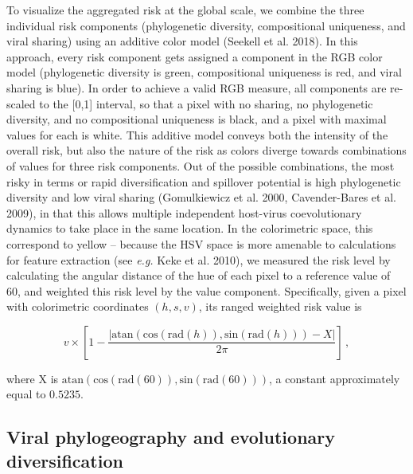 \documentclass[11pt]{article}
\begin{document}
To visualize the aggregated risk at the global scale, we combine the
three individual risk components (phylogenetic diversity, compositional
uniqueness, and viral sharing) using an additive color model (Seekell et
al. 2018). In this approach, every risk component gets assigned a
component in the RGB color model (phylogenetic diversity is green,
compositional uniqueness is red, and viral sharing is blue). In order to
achieve a valid RGB measure, all components are re-scaled to the
{[}0,1{]} interval, so that a pixel with no sharing, no phylogenetic
diversity, and no compositional uniqueness is black, and a pixel with
maximal values for each is white. This additive model conveys both the
intensity of the overall risk, but also the nature of the risk as colors
diverge towards combinations of values for three risk components. Out of
the possible combinations, the most risky in terms or rapid
diversification and spillover potential is high phylogenetic diversity
and low viral sharing (Gomulkiewicz et al. 2000, Cavender-Bares et al.
2009), in that this allows multiple independent host-virus
coevolutionary dynamics to take place in the same location. In the
colorimetric space, this correspond to yellow -- because the HSV space
is more amenable to calculations for feature extraction (see \emph{e.g.}
Keke et al. 2010), we measured the risk level by calculating the angular
distance of the hue of each pixel to a reference value of 60, and
weighted this risk level by the value component. Specifically, given a
pixel with colorimetric coordinates \((h,s,v)\), its ranged weighted
risk value is

\[
v\times\left[1-\frac{\left|\text{atan}\left(\text{cos}(\text{rad}(h)), \text{sin}(\text{rad}(h))\right) - X\right|}{2\pi}\right]\,,
\]

where X is
\(\text{atan}\left(\text{cos}(\text{rad}(60)), \text{sin}(\text{rad}(60))\right)\),
a constant approximately equal to \(0.5235\).

\hypertarget{viral-phylogeography-and-evolutionary-diversification}{%
\subsection{Viral phylogeography and evolutionary
diversification}\label{viral-phylogeography-and-evolutionary-diversification}}
\end{document}
